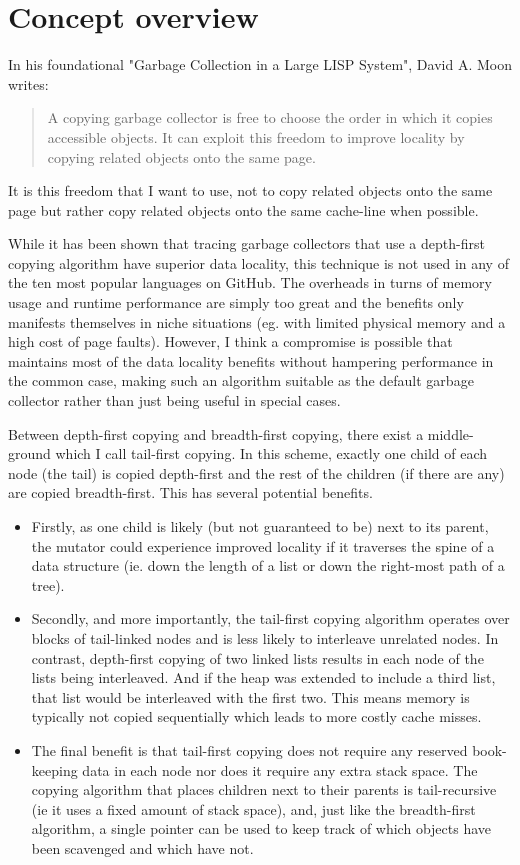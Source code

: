 \documentclass[a4paper,oneside]{memoir}
\begin{document}
\section{Concept overview}
\label{concept_overview}

In his foundational "Garbage Collection in a Large LISP System", David A. Moon writes:
\blockquote{A copying garbage collector is free to choose the order in which
it copies accessible objects. It can exploit this freedom to improve locality by
copying related objects onto the same page.}
\cite{Moon:1984}
It is this freedom that I want to use, not to copy related objects onto the same
page but rather copy related objects onto the same cache-line when possible.

While it has been shown that tracing garbage collectors that use a depth-first
copying algorithm have superior data locality, this technique is not used in any
of the ten most popular languages on GitHub. The overheads in turns of memory
usage and runtime performance are simply too great and the benefits only
manifests themselves in niche situations (eg. with limited physical memory and
a high cost of page faults). However, I think a compromise is possible that
maintains most of the data locality benefits without hampering performance in
the common case, making such an algorithm suitable as the default garbage
collector rather than just being useful in special cases.

Between depth-first copying and breadth-first copying, there exist a middle-ground
which I call tail-first copying. In this scheme, exactly one child of each node
(the tail) is copied depth-first and the rest of the children (if there are any)
are copied breadth-first. This has several potential benefits.
\begin{itemize}
  \item
  Firstly, as one
  child is likely (but not guaranteed to be) next to its parent, the mutator could
  experience improved locality if it traverses the spine of a data structure (ie.
  down the length of a list or down the right-most path of a tree).
  \item
  Secondly, and
  more importantly, the tail-first copying algorithm operates over blocks of
  tail-linked nodes and is less likely to interleave unrelated nodes. In contrast,
  depth-first copying of two linked lists results in each node of the lists being
  interleaved. And if the heap was extended to include a third list, that list
  would be interleaved with the first two. This means memory is typically not
  copied sequentially which leads to more costly cache misses.
  \item
  The final benefit
  is that tail-first copying does not require any reserved book-keeping data in
  each node nor does it require any extra stack space. The copying algorithm that
  places children next to their parents is tail-recursive (ie it uses a fixed
  amount of stack space), and, just like the breadth-first algorithm, a single
  pointer can be used to keep track of which objects have been scavenged and which
  have not.
\end{itemize}
\end{document}
